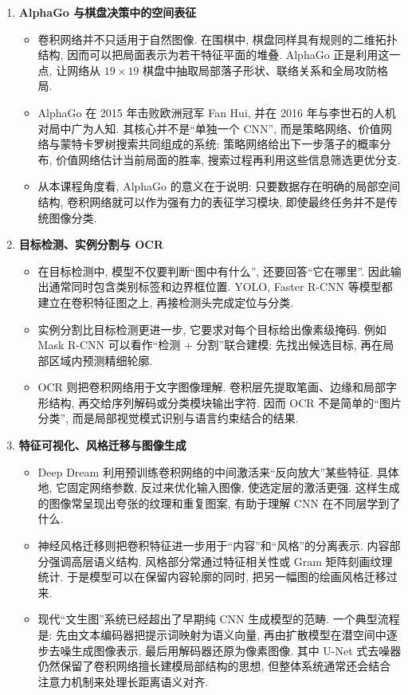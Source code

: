 \documentclass{../nndlcourse}
\begin{document}
\begin{enumerate}
    \item \textbf{AlphaGo 与棋盘决策中的空间表征}
    \begin{itemize}
        \item 卷积网络并不只适用于自然图像. 在围棋中, 棋盘同样具有规则的二维拓扑结构, 因而可以把局面表示为若干特征平面的堆叠. AlphaGo 正是利用这一点, 让网络从 $19 \times 19$ 棋盘中抽取局部落子形状、联络关系和全局攻防格局.
        \item AlphaGo 在 2015 年击败欧洲冠军 Fan Hui, 并在 2016 年与李世石的人机对局中广为人知. 其核心并不是“单独一个 CNN”, 而是策略网络、价值网络与蒙特卡罗树搜索共同组成的系统: 策略网络给出下一步落子的概率分布, 价值网络估计当前局面的胜率, 搜索过程再利用这些信息筛选更优分支.
        \item 从本课程角度看, AlphaGo 的意义在于说明: 只要数据存在明确的局部空间结构, 卷积网络就可以作为强有力的表征学习模块, 即使最终任务并不是传统图像分类.
    \end{itemize}

    \item \textbf{目标检测、实例分割与 OCR}
    \begin{itemize}
        \item 在目标检测中, 模型不仅要判断“图中有什么”, 还要回答“它在哪里”. 因此输出通常同时包含类别标签和边界框位置. YOLO, Faster R-CNN 等模型都建立在卷积特征图之上, 再接检测头完成定位与分类.
        \item 实例分割比目标检测更进一步, 它要求对每个目标给出像素级掩码. 例如 Mask R-CNN 可以看作“检测 + 分割”联合建模: 先找出候选目标, 再在局部区域内预测精细轮廓.
        \item OCR 则把卷积网络用于文字图像理解. 卷积层先提取笔画、边缘和局部字形结构, 再交给序列解码或分类模块输出字符. 因而 OCR 不是简单的“图片分类”, 而是局部视觉模式识别与语言约束结合的结果.
    \end{itemize}

    \item \textbf{特征可视化、风格迁移与图像生成}
    \begin{itemize}
        \item Deep Dream 利用预训练卷积网络的中间激活来“反向放大”某些特征. 具体地, 它固定网络参数, 反过来优化输入图像, 使选定层的激活更强. 这样生成的图像常呈现出夸张的纹理和重复图案, 有助于理解 CNN 在不同层学到了什么.
        \item 神经风格迁移则把卷积特征进一步用于“内容”和“风格”的分离表示. 内容部分强调高层语义结构, 风格部分常通过特征相关性或 Gram 矩阵刻画纹理统计. 于是模型可以在保留内容轮廓的同时, 把另一幅图的绘画风格迁移过来.
        \item 现代“文生图”系统已经超出了早期纯 CNN 生成模型的范畴. 一个典型流程是: 先由文本编码器把提示词映射为语义向量, 再由扩散模型在潜空间中逐步去噪生成图像表示, 最后用解码器还原为像素图像. 其中 U-Net 式去噪器仍然保留了卷积网络擅长建模局部结构的思想, 但整体系统通常还会结合注意力机制来处理长距离语义对齐.
    \end{itemize}


\end{enumerate}
\end{document}
